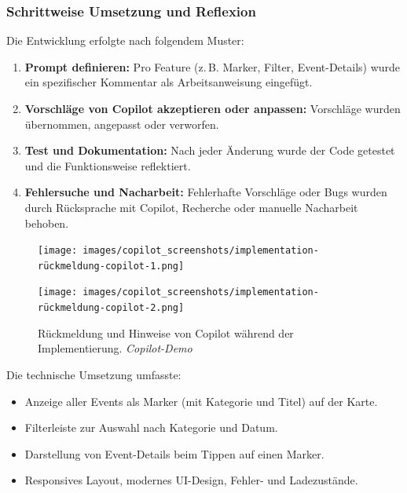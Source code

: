 \subsubsection{Schrittweise Umsetzung und Reflexion}
Die Entwicklung erfolgte nach folgendem Muster:
\begin{enumerate}
      \item \textbf{Prompt definieren:} Pro Feature (z.\,B. Marker, Filter, Event-Details) wurde ein spezifischer Kommentar als Arbeitsanweisung eingefügt.
      \item \textbf{Vorschläge von Copilot akzeptieren oder anpassen:} Vorschläge wurden übernommen, angepasst oder verworfen.
      \item \textbf{Test und Dokumentation:} Nach jeder Änderung wurde der Code getestet und die Funktionsweise reflektiert.
      \item \textbf{Fehlersuche und Nacharbeit:} Fehlerhafte Vorschläge oder Bugs wurden durch Rücksprache mit Copilot, Recherche oder manuelle Nacharbeit behoben.
\end{enumerate}

\begin{figure}[htbp]
      \centering
      \begin{minipage}{0.48\textwidth}
            \centering
            \texttt{[image: images/copilot\_screenshots/implementation-rückmeldung-copilot-1.png]}
      \end{minipage}
      \hfill
      \begin{minipage}{0.48\textwidth}
            \centering
            \texttt{[image: images/copilot\_screenshots/implementation-rückmeldung-copilot-2.png]}
      \end{minipage}
      \caption{Rückmeldung und Hinweise von Copilot während der Implementierung. \textit{Copilot-Demo}}
      \label{fig:copilot-impl-pair}
\end{figure}

\noindent Die technische Umsetzung umfasste:
\begin{itemize}
      \item Anzeige aller Events als Marker (mit Kategorie und Titel) auf der Karte.
      \item Filterleiste zur Auswahl nach Kategorie und Datum.
      \item Darstellung von Event-Details beim Tippen auf einen Marker.
      \item Responsives Layout, modernes UI-Design, Fehler- und Ladezustände.
\end{itemize}

